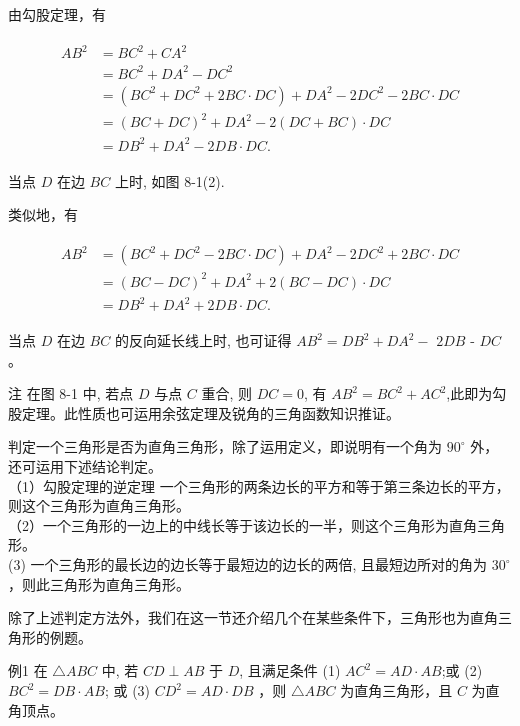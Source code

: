 \documentclass[10pt]{article}
\begin{document}
由勾股定理，有

\begin{align*}
\begin{aligned}
A B^{2} & =B C^{2}+C A^{2} \\
& =B C^{2}+D A^{2}-D C^{2} \\
& =\left(B C^{2}+D C^{2}+2 B C \cdot D C\right)+D A^{2}-2 D C^{2}-2 B C \cdot D C \\
& =(B C+D C)^{2}+D A^{2}-2(D C+B C) \cdot D C \\
& =D B^{2}+D A^{2}-2 D B \cdot D C .
\end{aligned}
\end{align*}

当点 $D$ 在边 $B C$ 上时, 如图 8-1(2).

类似地，有

\begin{align*}
\begin{aligned}
A B^{2} & =\left(B C^{2}+D C^{2}-2 B C \cdot D C\right)+D A^{2}-2 D C^{2}+2 B C \cdot D C \\
& =(B C-D C)^{2}+D A^{2}+2(B C-D C) \cdot D C \\
& =D B^{2}+D A^{2}+2 D B \cdot D C .
\end{aligned}
\end{align*}

当点 $D$ 在边 $B C$ 的反向延长线上时, 也可证得 $A B^{2}=D B^{2}+D A^{2}-$ $2 D B$ - $D C$ 。

注 在图 8-1 中, 若点 $D$ 与点 $C$ 重合, 则 $D C=0$, 有 $A B^{2}=B C^{2}+A C^{2}$,此即为勾股定理。此性质也可运用余弦定理及锐角的三角函数知识推证。

判定一个三角形是否为直角三角形，除了运用定义，即说明有一个角为 $90^{\circ}$ 外，还可运用下述结论判定。\\
（1）勾股定理的逆定理 一个三角形的两条边长的平方和等于第三条边长的平方，则这个三角形为直角三角形。\\
（2）一个三角形的一边上的中线长等于该边长的一半，则这个三角形为直角三角形。\\
(3) 一个三角形的最长边的边长等于最短边的边长的两倍, 且最短边所对的角为 $30^{\circ}$ ，则此三角形为直角三角形。

除了上述判定方法外，我们在这一节还介绍几个在某些条件下，三角形也为直角三角形的例题。

例1 在 $\triangle A B C$ 中, 若 $C D \perp A B$ 于 $D$, 且满足条件 (1) $A C^{2}=A D \cdot A B$;或 (2) $B C^{2}=D B \cdot A B$; 或 (3) $C D^{2}=A D \cdot D B$ ，则 $\triangle A B C$ 为直角三角形，且 $C$ 为直角顶点。
\end{document}
